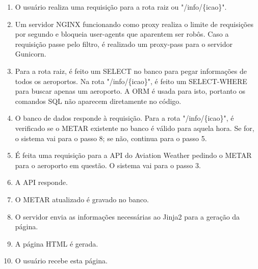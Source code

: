 \begin{enumerate}
\item O usuário realiza uma requisição para a rota raiz ou "/info/\{icao\}".
\item Um servidor NGINX funcionando como proxy realiza o limite de requisições por segundo
e bloqueia user-agents que aparentem ser robôs. Caso a requisição passe pelo filtro, é
realizado um proxy-pass para o servidor Gunicorn.
\item Para a rota raiz, é feito um SELECT no banco para pegar informações de todos os
aeroportos. Na rota "/info/\{icao\}", é feito um SELECT-WHERE para buscar apenas um aeroporto.
A ORM é usada para isto, portanto os comandos SQL não aparecem diretamente no código.
\item O banco de dados responde à requisição. Para a rota "/info/\{icao\}", é verificado 
se o METAR existente no banco é válido para aquela hora. Se for, o sistema vai para o passo 8;
se não, continua para o passo 5.
\item É feita uma requisição para a API do Aviation Weather pedindo o METAR para o 
aeroporto em questão. O sistema vai para o passo 3.
\item A API responde.
\item O METAR atualizado é gravado no banco.
\item O servidor envia as informações necessárias ao Jinja2 para a geração da página.
\item A página HTML é gerada.
\item O usuário recebe esta página.
\end{enumerate}
